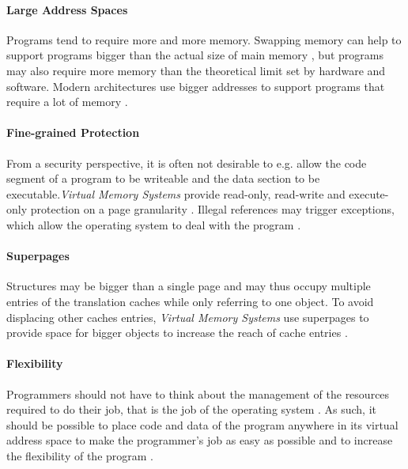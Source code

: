 
\paragraph{Large Address Spaces} Programs tend to require more and more memory. Swapping memory can help
to support programs bigger than the actual size of main memory \cite{tanenbaumOS}, but programs may
also require more memory than the theoretical limit set by hardware and software. Modern architectures
use bigger addresses to support programs that require a lot of memory
\cite{jacobSoftwaremanagedAddressTranslation1997, jacobVirtualMemoryContemporary1998}.


\paragraph{Fine-grained Protection} From a security perspective, it is often not desirable to e.g. allow the code segment
of a program to be writeable and the data section to be executable.\textit{Virtual Memory Systems} provide read-only,
read-write and execute-only protection on a page granularity \cite{jacobSoftwaremanagedAddressTranslation1997}.
Illegal references may trigger exceptions, which allow the operating system to deal with the program \cite{jacobVirtualMemoryContemporary1998}.


\paragraph{Superpages}
Structures may be bigger than a single page and may thus occupy multiple entries of the translation caches while
only referring to one object. To avoid displacing other caches entries, \textit{Virtual Memory Systems} use
superpages to provide space for bigger objects to increase the reach of cache entries \cite{jacobSoftwaremanagedAddressTranslation1997}.


\paragraph{Flexibility} Programmers should not have to think about the management
of the resources required to do their job, that is the job of the operating system \cite{tanenbaumOS}. As such, it should be possible to place code and data of the program anywhere in its virtual address space to make the programmer's
job as easy as possible and to increase the flexibility of the program
\cite{jacob1998virtualissues}. %

